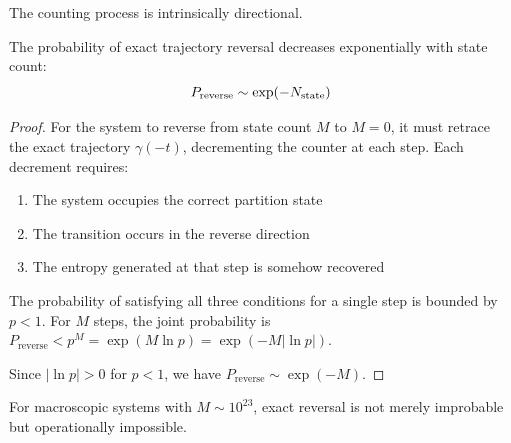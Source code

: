The counting process is intrinsically directional.

\begin{theorem}
\label{thm:irreversibility}
The probability of exact trajectory reversal decreases exponentially with state count:
\begin{equation}
    P_{\mathrm{reverse}} \sim \exp(-N_{\mathrm{state}})
\end{equation}
\end{theorem}

\begin{proof}
For the system to reverse from state count $M$ to $M = 0$, it must retrace the exact trajectory $\gamma(-t)$, decrementing the counter at each step. Each decrement requires:
\begin{enumerate}
    \item[(i)] The system occupies the correct partition state
    \item[(ii)] The transition occurs in the reverse direction
    \item[(iii)] The entropy generated at that step is somehow recovered
\end{enumerate}

The probability of satisfying all three conditions for a single step is bounded by $p < 1$. For $M$ steps, the joint probability is $P_{\mathrm{reverse}} < p^M = \exp(M \ln p) = \exp(-M |\ln p|)$.

Since $|\ln p| > 0$ for $p < 1$, we have $P_{\mathrm{reverse}} \sim \exp(-M)$.
\end{proof}

For macroscopic systems with $M \sim 10^{23}$, exact reversal is not merely improbable but operationally impossible.

